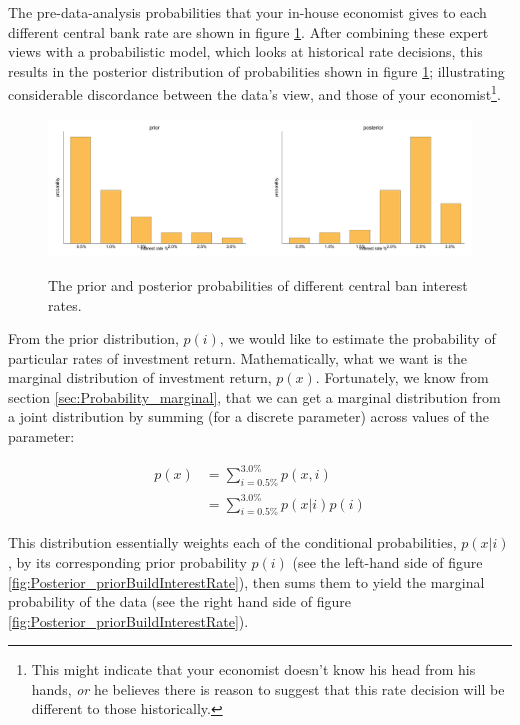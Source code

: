 \documentclass[11pt,fullpage]{book}
\begin{document}
The pre-data-analysis probabilities that your in-house economist gives to each different central bank rate are shown in figure \ref{fig:Posterior_priorPosteriorInterestRate}. After combining these expert views with a probabilistic model, which looks at historical rate decisions, this results in the posterior distribution of probabilities shown in figure \ref{fig:Posterior_priorPosteriorInterestRate}; illustrating considerable discordance between the data's view, and those of your economist\footnote{This might indicate that your economist doesn't know his head from his hands, \textit{or} he believes there is reason to suggest that this rate decision will be different to those historically.}.

\begin{figure}
\centering
\scalebox{0.45} 
{\includegraphics{Posterior_priorPosteriorInterestRate.pdf}}
\caption{The prior and posterior probabilities of different central ban interest rates.}\label{fig:Posterior_priorPosteriorInterestRate}
\end{figure}

From the prior distribution, $p(i)$, we would like to estimate the probability of particular rates of investment return. Mathematically, what we want is the marginal distribution of investment return, $p(x)$. Fortunately, we know from section \ref{sec:Probability_marginal}, that we can get a marginal distribution from a joint distribution by summing (for a discrete parameter) across values of the parameter:

\begin{align}\label{eq:Posterior_InterestpriorPredictiveDistribution}
p(x) &= \sum\limits_{i=0.5\%}^{3.0\%} p(x,i)\\
&= \sum\limits_{i=0.5\%}^{3.0\%} p(x|i) p(i)
\end{align}

This distribution essentially weights each of the conditional probabilities, $p(x|i)$, by its corresponding prior probability $p(i)$ (see the left-hand side of figure \ref{fig:Posterior_priorBuildInterestRate}), then sums them to yield the marginal probability of the data (see the right hand side of figure \ref{fig:Posterior_priorBuildInterestRate}).
\end{document}
